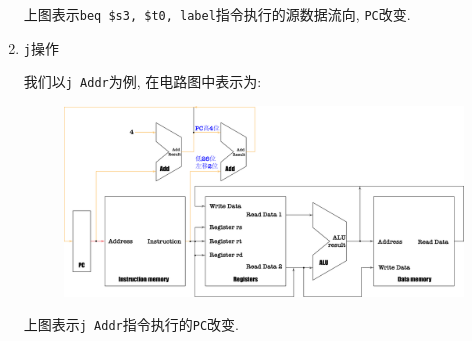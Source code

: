 \begin{enumerate}
\begin{figure}[H]
\end{figure}
上图表示\verb|beq $s3, $t0, label|指令执行的\textcolor{myred}{源数据流向}, \textcolor{myyellow}{\texttt{PC}改变}.
\item \texttt{j}操作 \par
我们以\verb|j Addr|为例, 在电路图中表示为:
\begin{figure}[H]
\centering
\includegraphics[scale=.3]{img/figure30.pdf}
\end{figure}
上图表示\verb|j Addr|指令执行的\textcolor{myyellow}{\texttt{PC}改变}.
\end{enumerate}
